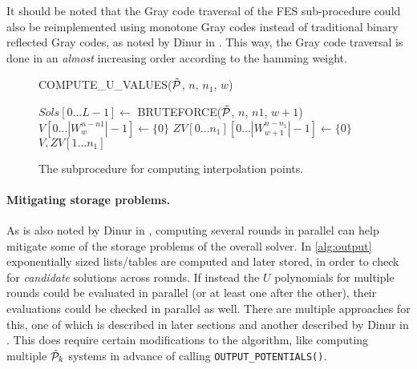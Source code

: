 It should be noted that the Gray code traversal of the FES sub-procedure could also be reimplemented using monotone Gray codes instead of traditional binary reflected Gray codes, as noted by Dinur in \cite{eurocrypt-2021-30841}. This way, the Gray code traversal is done in an \textit{almost} increasing order according to the hamming weight.

\begin{figure}[t]
    \centering
    \begin{alg}
        \caption{COMPUTE\_U\_VALUES($\Tilde{\mathcal{P}}$, $n$, $n_1$, $w$)} \label{alg:uvalue}
        \label{alg:uvalues}
        $Sols[0\dots L - 1] \gets$ BRUTEFORCE($\Tilde{\mathcal{P}}$, $n$, $n1$, $w + 1$)\; \label{alg:uvalues:bruteforce}
        $V[0\dots |W^{n - n1}_w| - 1] \gets \{0\}$\;
        $ZV[0\dots n_1][0\dots |W^{n - n_1}_{w + 1}| - 1] \gets \{0\}$\;
        \Return $V, ZV[1\dots n_1]$\;
    \end{alg}
    \caption{The subprocedure for computing interpolation points.}
\end{figure}

\paragraph{Mitigating storage problems.} As is also noted by Dinur in \cite{eurocrypt-2021-30841}, computing several rounds in parallel can help mitigate some of the storage problems of the overall solver. In \cref{alg:output} exponentially sized lists/tables are computed and later stored, in order to check for \textit{candidate} solutions across rounds. If instead the $U$ polynomials for multiple rounds could be evaluated in parallel (or at least one after the other), their evaluations could be checked in parallel as well. There are multiple approaches for this, one of which is described in later sections and another described by Dinur in \cite{eurocrypt-2021-30841}. This does require certain modifications to the algorithm, like computing multiple $\Tilde{\mathcal{P}}_k$ systems in advance of calling \texttt{OUTPUT\_POTENTIALS()}. 

\newpage